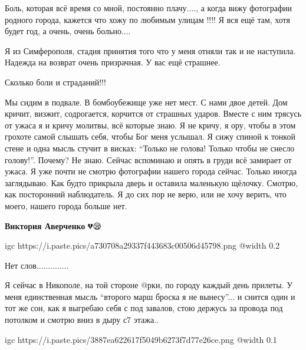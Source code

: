 
Боль, которая всё время со мной, постоянно плачу...., а когда вижу фотографии
родного города, кажется что хожу по любимым улицам !!!! Я вся ещё там, хотя
будет год, а очень, очень больно....


Я из Симферополя, стадия принятия того что у меня отняли так и не наступила.
Надежда на возврат очень призрачная. У вас ещё страшнее. 🙁


Сколько боли и страданий!!!


Мы сидим в подвале. В бомбоубежище уже нет мест. С нами двое детей. Дом кричит,
визжит, содрогается, корчится от страшных ударов. Вместе с ним трясусь от ужаса
я и кричу молитвы, всё которые знаю. Я не кричу, я ору, чтобы в этом грохоте
самой слышать себя, чтобы Бог меня услышал. Я сижу спиной к тонкой стене и одна
мысль стучит в висках: \enquote{Только не голова! Только чтобы не снесло голову!}.
Почему? Не знаю. Сейчас вспоминаю и опять в груди всё замирает от ужаса. Я уже
почти не смотрю фотографии нашего города сейчас. Только иногда заглядываю. Как
будто прикрыла дверь и оставила маленькую щёлочку. Смотрю, как посторонний
наблюдатель. Я до сих пор не верю, или не хочу верить, что моего, нашего города
больше нет.

\begin{itemize} %
\textbf{Виктория Аверченко} 💔😪
\end{itemize} %

\ifcmt
  igc https://i.paste.pics/a730708a29337f443683c00506d45798.png
  @width 0.2
\fi


Нет слов..............


Я сейчас в Никополе, на той стороне @рки, по городу каждый день прилеты. У меня
единственная мысль \enquote{второго марш броска я не вынесу}... и снится один и тот же
сон, как я выгребаю себя с под завалов, стою держусь за провода под потолком и
смотрю вниз в дыру с7 этажа..


\ifcmt
  igc https://i.paste.pics/3887ea622617f5049b6273f7d77e26ce.png
  @width 0.1
\fi



